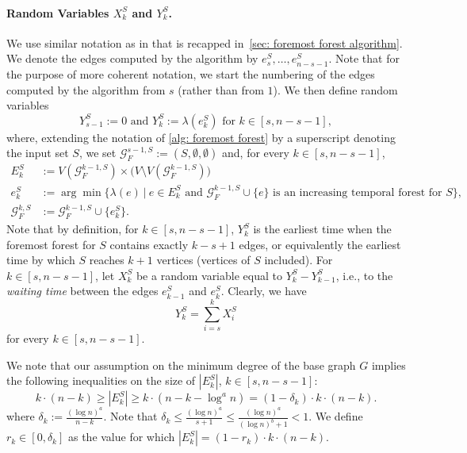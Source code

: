 \documentclass[a4paper,11pt]{article}
\theoremstyle{definition}
\theoremstyle{plain}
\newcommand{\GGG}{\mathcal{G}}
\begin{document}
\paragraph*{Random Variables $X^S_k$ and $Y^S_k$.}
We use similar notation as in \cite{CasteigtsRRZ21} that is recapped in~\cref{sec: foremost forest algorithm}.
We denote the edges computed by the algorithm by $e^S_{s},\ldots, e^S_{n-s-1}$.
Note that for the purpose of more coherent notation, we start the numbering of the edges computed by the algorithm from $s$ (rather than from $1$).
We then define random variables
\[
  Y^S_{s-1} := 0 \text{ and }
  Y^S_k := \lambda(e^S_{k})\text{ for $k\in [s, n-s-1]$},
\]
where, extending the notation of \cref{alg: foremost forest} by a superscript denoting the input set $S$, we set $\GGG_F^{s-1, S} := (S, \emptyset, \emptyset)$
and, for every $k\in [s, n-s-1]$,
\begin{equation*}
  \begin{split}
    E^S_k   &:= V(\GGG_F^{k-1, S}) \times \big( V \setminus V(\GGG_F^{k-1, S}) \big)\\
    e^S_{k} &:= \arg\min \{ \lambda(e) ~|~ e \in E^S_k \text{ and } \GGG_F^{k-1, S} \cup \{e \} \text{ is an increasing temporal forest for }S \}, \\
    \GGG_F^{k, S}   &:= \GGG_F^{k-1, S} \cup \{ e^S_{k} \}.
  \end{split}
\end{equation*}
Note that by definition, for $k\in [s, n-s-1]$, $Y^S_k$ is the earliest time when the foremost forest for $S$ contains exactly $k-s+1$ edges, or equivalently the earliest time by which $S$ reaches $k+1$ vertices (vertices of $S$ included).
%
For $k\in [s, n-s-1]$, let $X^S_k$ be a random variable equal to $Y^S_k - Y^S_{k-1}$,
i.e., to the \emph{waiting time} between the edges $e^S_{k-1}$ and $e^S_k$. Clearly, we have
\[
  Y^S_k = \sum_{i=s}^k X^S_i
\]
for every $k \in [s, n-s-1]$.

We note that our assumption on the minimum degree of the base graph $G$ implies the following inequalities on the size of $|E^S_k|$, $k\in [s, n-s-1]$:
\[
    k \cdot (n - k)
    \ge |E^S_k|
    \ge k \cdot (n-k-\log^a n)
    = (1-\delta_k)\cdot k \cdot (n - k).
\]
where $\delta_k:=\frac{(\log n)^a}{n-k}$. Note that $\delta_k \leq \frac{(\log n)^a}{s+1} \leq \frac{(\log n)^a}{(\log n)^b+1} < 1$. We define $r_k\in [0,\delta_k]$ as the value for which $|E^S_k| = (1-r_k)\cdot k\cdot (n-k)$.
\end{document}
